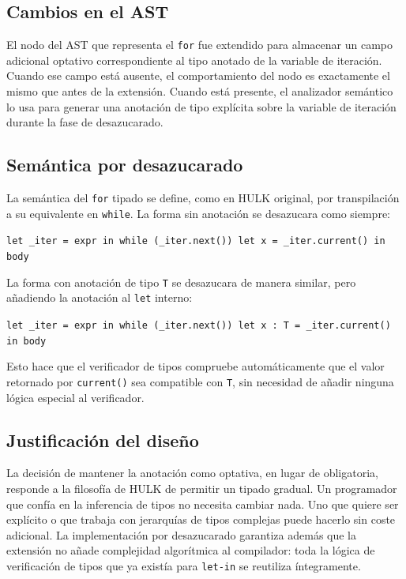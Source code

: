 \documentclass[12pt, a4paper]{article}
\begin{document}
\subsection{Cambios en el AST}

El nodo del AST que representa el \texttt{for} fue extendido para almacenar un campo adicional optativo correspondiente al tipo anotado de la variable de iteración. Cuando ese campo está ausente, el comportamiento del nodo es exactamente el mismo que antes de la extensión. Cuando está presente, el analizador semántico lo usa para generar una anotación de tipo explícita sobre la variable de iteración durante la fase de desazucarado.

\subsection{Semántica por desazucarado}

La semántica del \texttt{for} tipado se define, como en HULK original, por transpilación a su equivalente en \texttt{while}. La forma sin anotación se desazucara como siempre:

\begin{center}
\texttt{let \_iter = expr in while (\_iter.next()) let x = \_iter.current() in body}
\end{center}

La forma con anotación de tipo \texttt{T} se desazucara de manera similar, pero añadiendo la anotación al \texttt{let} interno:

\begin{center}
\texttt{let \_iter = expr in while (\_iter.next()) let x : T = \_iter.current() in body}
\end{center}

Esto hace que el verificador de tipos compruebe automáticamente que el valor retornado por \texttt{current()} sea compatible con \texttt{T}, sin necesidad de añadir ninguna lógica especial al verificador.

\subsection{Justificación del diseño}

La decisión de mantener la anotación como optativa, en lugar de obligatoria, responde a la filosofía de HULK de permitir un tipado gradual. Un programador que confía en la inferencia de tipos no necesita cambiar nada. Uno que quiere ser explícito o que trabaja con jerarquías de tipos complejas puede hacerlo sin coste adicional. La implementación por desazucarado garantiza además que la extensión no añade complejidad algorítmica al compilador: toda la lógica de verificación de tipos que ya existía para \texttt{let-in} se reutiliza íntegramente.
\end{document}
